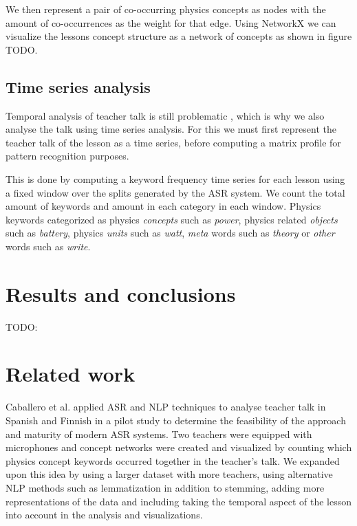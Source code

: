 \documentclass[utf8,english]{gradu3}
\begin{document}
We then represent a pair of co-occurring physics concepts as nodes with the amount of co-occurrences as the weight for that edge. Using NetworkX \parencite{hagbergExploringNetworkStructure2008} we can visualize the lessons concept structure as a network of concepts as shown in figure TODO.

\section{Time series analysis}

Temporal analysis of teacher talk is still problematic \parencite{lehesvuoriVisualizingCommunicationStructures2013}, which is why we also analyse the talk using time series analysis. For this we must first represent the teacher talk of the lesson as a time series, before computing a matrix profile for pattern recognition purposes.

This is done by computing a keyword frequency time series for each lesson using a fixed window over the splits generated by the ASR system. We count the total amount of keywords and amount in each category in each window. Physics keywords categorized as physics \emph{concepts} such as \emph{power}, physics related \emph{objects} such as \emph{battery}, physics \emph{units} such as \emph{watt}, \emph{meta} words such as \emph{theory} or \emph{other} words such as \emph{write}.


\chapter{Results and conclusions}


TODO:
\chapter{Related work}

Caballero et al. \parencite*{caballeroASRClassroomToday2017} applied ASR and NLP techniques to analyse teacher talk in Spanish and Finnish in a pilot study to determine the feasibility of the approach and maturity of modern ASR systems. Two teachers were equipped with microphones and concept networks were created and visualized by counting which physics concept keywords occurred together in the teacher's talk. We expanded upon this idea by using a larger dataset with more teachers, using alternative NLP methods such as lemmatization in addition to stemming, adding more representations of the data and including taking the temporal aspect of the lesson into account in the analysis and visualizations.
\end{document}
